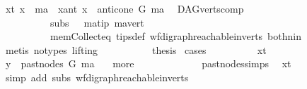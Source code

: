\begin{isabellebody}
\ {\isacharparenleft}{\kern0pt}x{\isacharunderscore}{\kern0pt}t{\isacharparenright}{\kern0pt}\ {\isachardoublequoteopen}x\ {\isacharequal}{\kern0pt}\ ma{\isachardoublequoteclose}\ {\isacharbar}{\kern0pt}\ {\isacharparenleft}{\kern0pt}x{\isacharunderscore}{\kern0pt}ant{\isacharparenright}{\kern0pt}\ {\isachardoublequoteopen}x\ {\isasymin}\ anticone\ G\ ma{\isachardoublequoteclose}\ \isamarkupfalse%
\ DAG{\isachardot}{\kern0pt}verts{\isacharunderscore}{\kern0pt}comp{}\ \isanewline
\ \ \ \ \ \ \ \ \ \ subs\ {}\ \ ma{\isacharunderscore}{\kern0pt}tip\ ma{\isacharunderscore}{\kern0pt}vert\ \isanewline
\ \ \ \ \ \ \ \ \ \ mem{\isacharunderscore}{\kern0pt}Collect{\isacharunderscore}{\kern0pt}eq\ tips{\isacharunderscore}{\kern0pt}def\ wf{\isacharunderscore}{\kern0pt}digraph{\isachardot}{\kern0pt}reachable{}{\isacharunderscore}{\kern0pt}in{\isacharunderscore}{\kern0pt}verts{\isacharparenleft}{\kern0pt}{}{\isacharparenright}{\kern0pt}\ both{\isacharunderscore}{\kern0pt}nin\isanewline
\ \ \ \ \ \ \ \ \isamarkupfalse%
\ {\isacharparenleft}{\kern0pt}metis\ {\isacharparenleft}{\kern0pt}no{\isacharunderscore}{\kern0pt}types{\isacharcomma}{\kern0pt}\ lifting{\isacharparenright}{\kern0pt}{\isacharparenright}{\kern0pt}\ \isanewline
\ \ \ \ \ \ \isamarkupfalse%
\ \isamarkupfalse%
\ {\isacharquery}{\kern0pt}thesis\ \isamarkupfalse%
{\isacharparenleft}{\kern0pt}cases{\isacharparenright}{\kern0pt}\isanewline
\ \ \ \ \ \ \ \ \isamarkupfalse%
\ x{\isacharunderscore}{\kern0pt}t\ \isanewline
\ \ \ \ \ \ \ \ \isamarkupfalse%
\ {\isachardoublequoteopen}y\ {\isasymin}\ past{\isacharunderscore}{\kern0pt}nodes\ G\ ma{\isachardoublequoteclose}\ \isamarkupfalse%
\ {}{\isacharparenleft}{\kern0pt}{}{\isacharparenright}{\kern0pt}\ more\ \isanewline
\ \ \ \ \ \ \ \ \ \ \ \ past{\isacharunderscore}{\kern0pt}nodes{\isachardot}{\kern0pt}simps\ \isamarkupfalse%
\ x{\isacharunderscore}{\kern0pt}t\isanewline
\ \ \ \ \ \ \ \ \ \ \isamarkupfalse%
\ {\isacharparenleft}{\kern0pt}simp\ add{\isacharcolon}{\kern0pt}\ subs\ wf{\isacharunderscore}{\kern0pt}digraph{\isachardot}{\kern0pt}reachable{}{\isacharunderscore}{\kern0pt}in{\isacharunderscore}{\kern0pt}verts{\isacharparenleft}{\kern0pt}{}{\isacharparenright}{\kern0pt}{\isacharparenright}{\kern0pt}\ \isanewline
\ \ \ \ \ \ \ \ \isamarkupfalse%
\ \isamarkupfalse%

\end{isabellebody}
